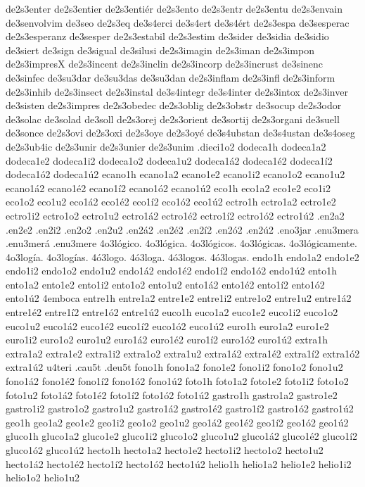 {de2s3enter
de2s3entier
de2s3entiér
de2s3ento
de2s3entr
de2s3entu
de2s3envain
de3senvolvim
de3seo
de2s3eq
de3s4erci
de3s4ert
de3s4ért
de2s3espa
de3sesperac
de2s3esperanz
de3sesper
de2s3estabil
de2s3estim
de3sider
de3sidia
de3sidio
de3siert
de3sign
de3sigual
de3silusi
de2s3imagin
de2s3iman
de2s3impon
de2s3impresX
de2s3incent
de2s3inclin
de2s3incorp
de2s3incrust
de3sinenc
de3sinfec
de3su3dar
de3su3das
de3su3dan
de2s3inflam
de2s3infl
de2s3inform
de2s3inhib
de2s3insect
de2s3instal
de3s4integr
de3s4inter
de2s3intox
de2s3inver
de3sisten
de2s3impres
de2s3obedec
de2s3oblig
de2s3obstr
de3socup
de2s3odor
de3solac
de3solad
de3soll
de2s3orej
de2s3orient
de3sortij
de2s3organi
de3suell
de3sonce
de2s3ovi
de2s3oxi
de2s3oye
de2s3oyé
de3s4ubstan
de3s4ustan
de3s4oseg
de2s3ub4ic
de2s3unir
de2s3unier
de2s3unim
.dieci1o2
dodeca1h
dodeca1a2 dodeca1e2 dodeca1i2 dodeca1o2 dodeca1u2
dodeca1á2 dodeca1é2 dodeca1í2 dodeca1ó2 dodeca1ú2
ecano1h
ecano1a2 ecano1e2 ecano1i2 ecano1o2 ecano1u2
ecano1á2 ecano1é2 ecano1í2 ecano1ó2 ecano1ú2
eco1h
eco1a2 eco1e2 eco1i2 eco1o2 eco1u2
eco1á2 eco1é2 eco1í2 eco1ó2 eco1ú2
ectro1h
ectro1a2 ectro1e2 ectro1i2 ectro1o2 ectro1u2
ectro1á2 ectro1é2 ectro1í2 ectro1ó2 ectro1ú2
.en2a2 .en2e2 .en2i2 .en2o2 .en2u2
.en2á2 .en2é2 .en2í2 .en2ó2 .en2ú2
.eno3jar
.enu3mera
.enu3merá
.enu3mere
4o3lógico.
4o3lógica.
4o3lógicos.
4o3lógicas.
4o3lógicamente.
4o3logía.
4o3logías.
4ó3logo.
4ó3loga.
4ó3logos.
4ó3logas.
endo1h
endo1a2 endo1e2 endo1i2 endo1o2 endo1u2
endo1á2 endo1é2 endo1í2 endo1ó2 endo1ú2
ento1h
ento1a2 ento1e2 ento1i2 ento1o2 ento1u2
ento1á2 ento1é2 ento1í2 ento1ó2 ento1ú2
4emboca
entre1h
entre1a2 entre1e2 entre1i2 entre1o2 entre1u2
entre1á2 entre1é2 entre1í2 entre1ó2 entre1ú2
euco1h
euco1a2 euco1e2 euco1i2 euco1o2 euco1u2
euco1á2 euco1é2 euco1í2 euco1ó2 euco1ú2
euro1h
euro1a2 euro1e2 euro1i2 euro1o2 euro1u2
euro1á2 euro1é2 euro1í2 euro1ó2 euro1ú2
extra1h
extra1a2 extra1e2 extra1i2 extra1o2 extra1u2
extra1á2 extra1é2 extra1í2 extra1ó2 extra1ú2
u4teri
.cau5t
.deu5t
fono1h
fono1a2 fono1e2 fono1i2 fono1o2 fono1u2
fono1á2 fono1é2 fono1í2 fono1ó2 fono1ú2
foto1h
foto1a2 foto1e2 foto1i2 foto1o2 foto1u2
foto1á2 foto1é2 foto1í2 foto1ó2 foto1ú2
gastro1h
gastro1a2 gastro1e2 gastro1i2 gastro1o2 gastro1u2
gastro1á2 gastro1é2 gastro1í2 gastro1ó2 gastro1ú2
geo1h
geo1a2 geo1e2 geo1i2 geo1o2 geo1u2
geo1á2 geo1é2 geo1í2 geo1ó2 geo1ú2
gluco1h
gluco1a2 gluco1e2 gluco1i2 gluco1o2 gluco1u2
gluco1á2 gluco1é2 gluco1í2 gluco1ó2 gluco1ú2
hecto1h
hecto1a2 hecto1e2 hecto1i2 hecto1o2 hecto1u2
hecto1á2 hecto1é2 hecto1í2 hecto1ó2 hecto1ú2
helio1h
helio1a2 helio1e2 helio1i2 helio1o2 helio1u2
}
